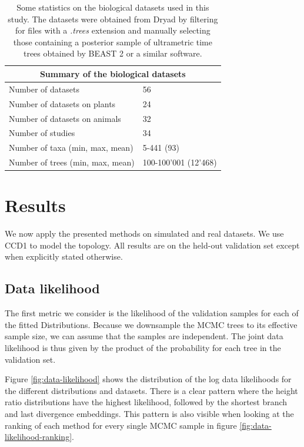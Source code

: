 \documentclass[10pt,letterpaper]{article}
\begin{document}
\begin{table}[h!]
	\caption{Some statistics on the biological datasets used in this study. The datasets were obtained from Dryad \cite{dryad} by filtering for files with a \emph{.trees} extension and manually selecting those containing a posterior sample of ultrametric time trees obtained by BEAST 2 or a similar software.}
	\label{table-bio-datasets}

	\centering
	\begin{tabular}{@{}ll@{}}
		\toprule
		\multicolumn{2}{c}{Summary of the biological datasets} \\
		\midrule
		Number of datasets	& 56 \\
		Number of datasets on plants & 24 \\
		Number of datasets on animals & 32 \\
		Number of studies	& 34 \\
		Number of taxa (min, max, mean) & 5-441 (93) \\
		Number of trees (min, max, mean) & 100-100'001 (12'468) \\
		\bottomrule
	\end{tabular}
\end{table}

\section*{Results}

We now apply the presented methods on simulated and real datasets. We use CCD1 to model the topology. All results are on the held-out validation set except when explicitly stated otherwise.

\subsection*{Data likelihood}

The first metric we consider is the likelihood of the validation samples for each of the fitted Distributions. Because we downsample the MCMC trees to its effective sample size, we can assume that the samples are independent. The joint data likelihood is thus given by the product of the probability for each tree in the validation set.

Figure \ref{fig:data-likelihood} shows the distribution of the log data likelihoods for the different distributions and datasets. There is a clear pattern where the height ratio distributions have the highest likelihood, followed by the shortest branch and last divergence embeddings. This pattern is also visible when looking at the ranking of each method for every single MCMC sample in figure \ref{fig:data-likelihood-ranking}.
\end{document}
